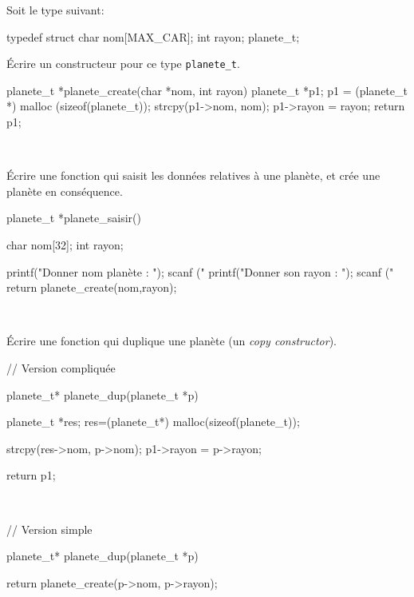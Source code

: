 \documentclass[10pt]{article}\usepackage[nu,correction]{esial}
\begin{document}
\bigskip\bigskip{}

Soit le type suivant:


\medskip

\begin{boxedverbatim}
  typedef struct {
    char nom[MAX_CAR];
    int  rayon;  
  } planete_t;
\end{boxedverbatim}


\Question Écrire un constructeur pour ce type \texttt{planete\_t}.

\begin{Reponse}
  \begin{boxedverbatim} 
planete_t *planete_create(char *nom, int rayon) {
    planete\_t *p1;
    p1 = (planete_t *) malloc (sizeof(planete_t));
    strcpy(p1->nom, nom);
    p1->rayon = rayon;
    return p1;
}  \end{boxedverbatim}
~
\end{Reponse}
	  
\Question Écrire une fonction qui saisit les données relatives à une
planète, et crée une planète en conséquence.

\begin{Reponse}
  \begin{boxedverbatim} 
planete_t *planete_saisir(){
  char nom[32];
  int rayon;

  printf("Donner nom planète : ");
  scanf ("%
  printf("Donner son rayon : ");
  scanf ("%
  return planete_create(nom,rayon);
}  \end{boxedverbatim}
~
\end{Reponse}

\Question Écrire une fonction qui duplique une planète (un
\textit{copy constructor}). 

\begin{Reponse}
  \noindent
  \begin{boxedverbatim} 
// Version compliquée

planete_t* planete_dup(planete_t *p){

  planete_t *res;
  res=(planete_t*)
      malloc(sizeof(planete_t));
  
  strcpy(res->nom, p->nom);
  p1->rayon = p->rayon;
  
  return p1;
} \end{boxedverbatim}
~~~
  \begin{boxedverbatim} 
// Version simple

planete_t* planete_dup(planete_t *p){

  return planete_create(p->nom, 
                        p->rayon);
} 






\end{boxedverbatim}
~
\end{Reponse}
\end{document}
